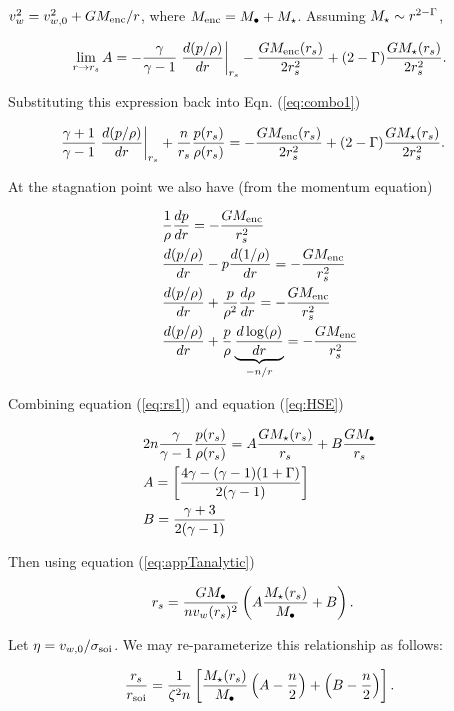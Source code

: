 $v_w^2=v_{w,0}^2+ G M_{\rm enc}/r$, where
$M_{\rm enc}=M_{\bullet}+M_{\star}$. Assuming $M_{\star} \sim r^{2-\Gamma}$,

\begin{align}
\lim_{r \rightarrow r_s} A=-\frac{\gamma}{\gamma-1}
\left.\frac{d (p/\rho)}{d r}\right|_{r_s}-\frac{G M_{\rm enc}(r_s)}{2 r_s^2}+(2-\Gamma) \frac{G
  M_{\star}(r_s)}{2 r_s^2}.
\end{align}

Substituting this expression back into Eqn. (\ref{eq:combo1})

\begin{align}
&\frac{\gamma+1}{\gamma-1}
\left.\frac{d (p/\rho)}{d r}\right|_{r_s}+\frac{n}{r_s}
\frac{p(r_s)}{\rho(r_s)}=-\frac{G M_{\rm enc}(r_s)}{2 r_s^2} + (2-\Gamma) \frac{G
  M_{\star}(r_s)}{2 r_s^2}.  \label{eq:rs1}
\end{align}

At the stagnation point we also have (from the momentum equation)

\begin{align}
&\frac{1}{\rho}\frac{d p}{d r}=- \frac{GM_{\rm enc}}{r_s^2}\\
&\frac{d (p/\rho)}{d r}-p \frac{d (1/\rho)}{d r}=-\frac{G M_{\rm enc}}{r_s^2}\\
&\frac{d (p/\rho)}{d r}+\frac{p}{\rho^2} \frac{d \rho}{d r} = -\frac{G M_{\rm enc}}{r_s^2}\\
&\frac{d (p/\rho)}{d r}+\frac{p}{\rho}
\underbrace{\frac{d\log(\rho)}{dr}}_{-n/r} = -\frac{G M_{\rm enc}}{r_s^2} \label{eq:HSE}
\end{align}

Combining equation (\ref{eq:rs1}) and equation (\ref{eq:HSE}) 

\begin{align}
&2 n \frac{\gamma}{\gamma-1} \frac{p(r_s)}{\rho(r_s)}= A \frac{G M_{\star}(r_s)}{r_s} +B \frac{G M_{\bullet}}{r_s}\\
&A=\left[\frac{4\gamma-(\gamma-1)(1+\Gamma)}{2 (\gamma-1)}\right]\\
&B=\frac{\gamma+3}{2 (\gamma-1)}
\end{align}

Then using equation (\ref{eq:appTanalytic})

\begin{align}
& r_s=\frac{G M_{\bullet}}{n v_w(r_s)^2}\left(A \frac{M_{\star}(r_s)}{M_{\bullet}} +B\right).
\end{align}

Let  $\eta=v_{w,0}/\sigma_{\rm soi}$. We
may re-parameterize this relationship as follows:

\begin{align}
  \frac{r_s}{r_{\rm soi}}=\frac{1}{\zeta^2 n}\left[
   \frac{M_{\star}(r_s)}{M_{\bullet}}\left(A-\frac{n}{2}\right)+\left(B-\frac{n}{2}\right)\right].
\end{align}

